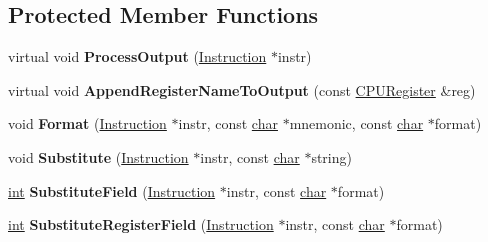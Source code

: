 \subsection*{Protected Member Functions}
\begin{DoxyCompactItemize}
\item 
\mbox{\label{classv8_1_1internal_1_1DisassemblingDecoder_a6d4606cecb0c3de62249fca3c7754b45}} 
virtual void {\bfseries Process\+Output} (\mbox{\hyperlink{classv8_1_1internal_1_1Instruction}{Instruction}} $\ast$instr)
\item 
\mbox{\label{classv8_1_1internal_1_1DisassemblingDecoder_a8f85c2a700a209994d4ed7b5b4599c32}} 
virtual void {\bfseries Append\+Register\+Name\+To\+Output} (const \mbox{\hyperlink{classv8_1_1internal_1_1CPURegister}{C\+P\+U\+Register}} \&reg)
\item 
\mbox{\label{classv8_1_1internal_1_1DisassemblingDecoder_a7613a666e4acf37f18b471d696160108}} 
void {\bfseries Format} (\mbox{\hyperlink{classv8_1_1internal_1_1Instruction}{Instruction}} $\ast$instr, const \mbox{\hyperlink{classchar}{char}} $\ast$mnemonic, const \mbox{\hyperlink{classchar}{char}} $\ast$format)
\item 
\mbox{\label{classv8_1_1internal_1_1DisassemblingDecoder_a19663c822d13e5e7251dbf73cc95a457}} 
void {\bfseries Substitute} (\mbox{\hyperlink{classv8_1_1internal_1_1Instruction}{Instruction}} $\ast$instr, const \mbox{\hyperlink{classchar}{char}} $\ast$string)
\item 
\mbox{\label{classv8_1_1internal_1_1DisassemblingDecoder_accbbe90732e4d3251f853a649d5b41a0}} 
\mbox{\hyperlink{classint}{int}} {\bfseries Substitute\+Field} (\mbox{\hyperlink{classv8_1_1internal_1_1Instruction}{Instruction}} $\ast$instr, const \mbox{\hyperlink{classchar}{char}} $\ast$format)
\item 
\mbox{\label{classv8_1_1internal_1_1DisassemblingDecoder_a5c71f924ee011b47df430b3b0319df6b}} 
\mbox{\hyperlink{classint}{int}} {\bfseries Substitute\+Register\+Field} (\mbox{\hyperlink{classv8_1_1internal_1_1Instruction}{Instruction}} $\ast$instr, const \mbox{\hyperlink{classchar}{char}} $\ast$format)

\end{DoxyCompactItemize}
